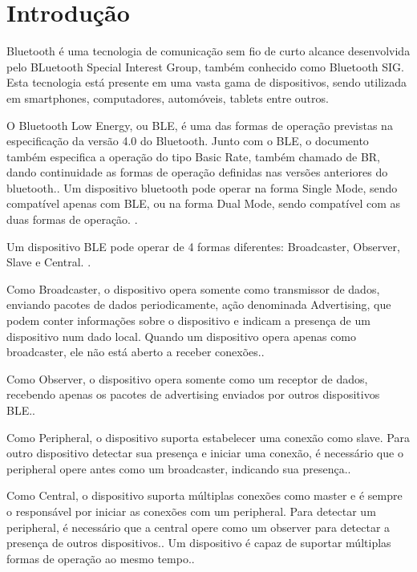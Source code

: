 \section{Introdução}

Bluetooth é uma tecnologia de comunicação sem fio de curto alcance desenvolvida
pelo BLuetooth Special Interest Group, também conhecido como Bluetooth SIG. Esta
tecnologia está presente em uma vasta gama de dispositivos, sendo utilizada em
smartphones, computadores, automóveis, tablets entre
outros\cite{gomez2012overview}.

O Bluetooth Low Energy, ou BLE, é uma das formas de operação previstas na
especificação da versão 4.0 do Bluetooth. Junto com o BLE, o documento também
especifica a operação do tipo Basic Rate, também chamado de BR, dando
continuidade as formas de operação definidas nas versões anteriores do bluetooth.\cite{ble4core}.
Um dispositivo bluetooth pode operar na forma Single Mode, sendo compatível
apenas com BLE, ou na forma Dual Mode, sendo compatível com as duas
formas de operação. \cite{ble4core}.


Um dispositivo BLE pode operar de 4 formas diferentes: Broadcaster, Observer,
Slave e Central. \cite{ble4core}.

Como Broadcaster, o dispositivo opera somente como transmissor de dados,
enviando pacotes de dados periodicamente, ação denominada Advertising, que
podem conter informações sobre o dispositivo e indicam a presença de um 
dispositivo num dado local. Quando um dispositivo opera apenas como
broadcaster, ele não está aberto a receber conexões.\cite{ble4core}.

Como Observer, o dispositivo opera somente como um receptor de dados, recebendo
apenas os pacotes de advertising enviados por outros dispositivos
BLE.\cite{ble4core}.

Como Peripheral, o dispositivo suporta estabelecer uma conexão como slave. Para
outro dispositivo detectar sua presença e iniciar uma conexão, é necessário que
o peripheral opere antes como um broadcaster, indicando sua
presença.\cite{ble4core}.

Como Central, o dispositivo suporta múltiplas conexões como master e é sempre o
responsável por iniciar as conexões com um peripheral. Para detectar um
peripheral, é necessário que a central opere como um observer para detectar a
presença de outros dispositivos.\cite{ble4core}. Um dispositivo é capaz de
suportar múltiplas formas de operação ao mesmo tempo.\cite{ble4core}.

